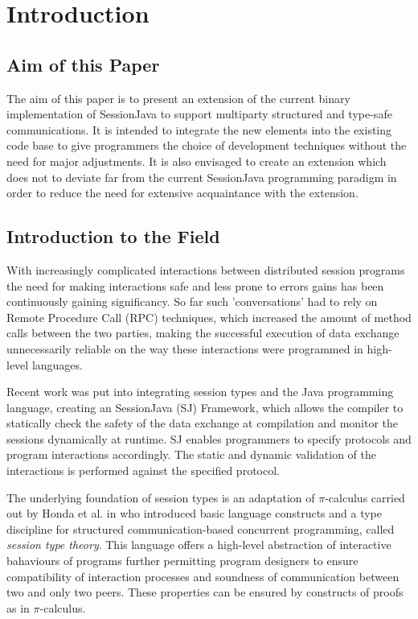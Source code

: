 \chapter{Introduction}
\label{sec:intro}

\section{Aim of this Paper}

The aim of this paper is to present an extension of the current binary implementation of SessionJava to support multiparty structured and type-safe communications. It is intended to integrate the new elements into the existing code base to give programmers the choice of development techniques without the need for major adjustments. It is also envisaged to create an extension which does not to deviate far from the current SessionJava programming paradigm in order to reduce the need for extensive acquaintance with the extension.   

\section{Introduction to the Field}

With increasingly complicated interactions between distributed session programs the need for making interactions safe and less prone to errors gains has been continuously gaining significancy. So far such 'conversations' had to rely on Remote Procedure Call (RPC) techniques, which increased the amount of method calls between the two parties, making the successful execution of data exchange unnecessarily reliable on the way these interactions were programmed in high-level languages.

Recent work was put into integrating session types and the Java programming language, creating an SessionJava (SJ) Framework, which allows the compiler to statically check the safety of the data exchange at compilation and monitor the sessions dynamically at runtime\cite{sessionbased_programming}. SJ enables programmers to specify protocols and program interactions accordingly. The static and dynamic validation of the interactions is performed against the specified protocol.

The underlying foundation of session types is an adaptation of $\pi$-calculus carried out by Honda et al. in \cite{language_primitives} who introduced basic language constructs and a type discipline for structured communication-based concurrent programming, called \textit{session type theory}. This language offers a high-level abstraction of interactive bahaviours of programs further permitting program designers to ensure compatibility of interaction processes and soundness of communication between two and only two peers. These properties can be ensured by constructs of proofs as in $\pi$-calculus.


